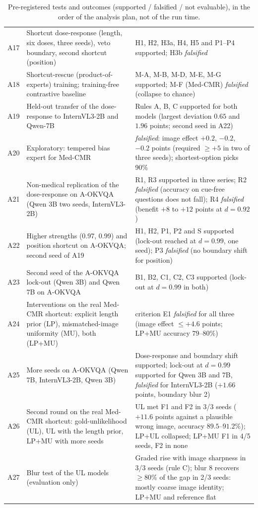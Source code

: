 \begin{table}[h]
{\begin{tabular}{@{}l p{} p{}@{}}
    A17 & Shortcut dose-response (length, six doses, three seeds), veto boundary, second shortcut (position) & H1, H2, H3a, H4, H5 and P1--P4 supported; H3b \emph{falsified} \\
    A18 & Shortcut-rescue (product-of-experts) training; training-free contrastive baseline & M-A, M-B, M-D, M-E, M-G supported; M-F (Med-CMR) \emph{falsified} (collapse to chance) \\
    A19 & Held-out transfer of the dose-response to InternVL3-2B and Qwen-7B & Rules A, B, C supported for both models (largest deviation $0.65$ and $1.96$ points; second seed in A22) \\
    A20 & Exploratory: tempered bias expert for Med-CMR & \emph{falsified}: image effect $+0.2$, $-0.2$, $-0.2$ points (required $\ge+5$ in two of three seeds); shortest-option picks 90\% \\
    A21 & Non-medical replication of the dose-response on A-OKVQA (Qwen 3B two seeds, InternVL3-2B) & R1, R3 supported in three series; R2 \emph{falsified} (accuracy on cue-free questions does not fall); R4 \emph{falsified} (benefit $+8$ to $+12$ points at $d=0.92$) \\
    A22 & Higher strengths (0.97, 0.99) and position shortcut on A-OKVQA; second seed of A19 & H1, H2, P1, P2 and S supported (lock-out reached at $d=0.99$, one seed); P3 \emph{falsified} (no boundary shift for position) \\
    A23 & Second seed of the A-OKVQA lock-out (Qwen 3B) and Qwen 7B on A-OKVQA & B1, B2, C1, C2, C3 supported (lock-out at $d=0.99$ in both) \\
    A24 & Interventions on the real Med-CMR shortcut: explicit length prior (LP), mismatched-image uniformity (MU), both (LP+MU) & criterion E1 \emph{falsified} for all three (image effect $\le+4.6$ points; LP+MU accuracy $79$--$80\%$) \\
    A25 & More seeds on A-OKVQA (Qwen 7B, InternVL3-2B, Qwen 3B) & Dose-response and boundary shift supported; lock-out at $d=0.99$ supported for Qwen 3B and 7B, \emph{falsified} for InternVL3-2B ($+1.66$ points, boundary blur 2) \\
    A26 & Second round on the real Med-CMR shortcut: gold-unlikelihood (UL), UL with the length prior, LP+MU with more seeds & UL met F1 and F2 in 3/3 seeds ($+11.6$ points against a plausible wrong image, accuracy $89.5$--$91.2\%$); LP+UL collapsed; LP+MU F1 in 4/5 seeds, F2 in none \\
    A27 & Blur test of the UL models (evaluation only) & Graded rise with image sharpness in 3/3 seeds (rule C); blur 8 recovers $\ge80\%$ of the gap in 2/3 seeds: mostly coarse image identity; LP+MU and reference flat \\
    \bottomrule
  \end{tabular}%
  }
  \caption{Pre-registered tests and outcomes (supported / falsified / not evaluable), in the order of the analysis plan, not of the run time.}
  \label{tab:amend}
\end{table}

